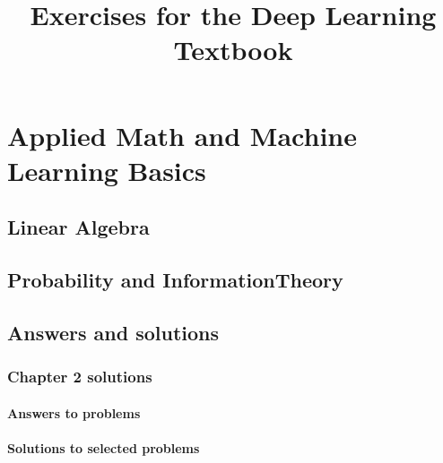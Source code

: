 \documentclass[letterpaper,oneside]{book}
\title{Exercises for the Deep Learning Textbook}
\newif\ifSOLSINTHEBACK
\begin{document}
\maketitle


\part{Applied Math and Machine Learning Basics}

	\setcounter{chapter}{1}
	\chapter{Linear Algebra}
	


	\chapter{Probability and InformationTheory}
	





\appendix 



\ifSOLSINTHEBACK

	\chapter{Answers and solutions}

	\section*{Chapter 2 solutions}
	\label{sec:chapter2sols}	
	{ \footnotesize 

		
		\subsection*{Answers to problems}

		\subsection*{Solutions to selected problems}

	}
\end{document}
